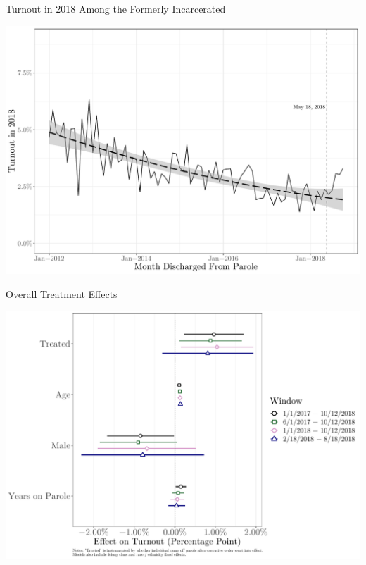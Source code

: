 \documentclass[
  ignorenonframetext,
]{beamer}
\begin{document}
\begin{frame}{Turnout in 2018 Among the Formerly Incarcerated}
\protect\hypertarget{turnout-in-2018-among-the-formerly-incarcerated}{}
\begin{center}\includegraphics[width=0.85\linewidth,height=0.85\textheight]{mpsa_files/figure-beamer/unnamed-chunk-2-1} \end{center}
\end{frame}

\begin{frame}{Overall Treatment Effects}
\protect\hypertarget{overall-treatment-effects}{}
\begin{center}\includegraphics[width=0.85\linewidth,height=0.85\textheight]{mpsa_files/figure-beamer/unnamed-chunk-3-1} \end{center}
\end{frame}
\end{document}
